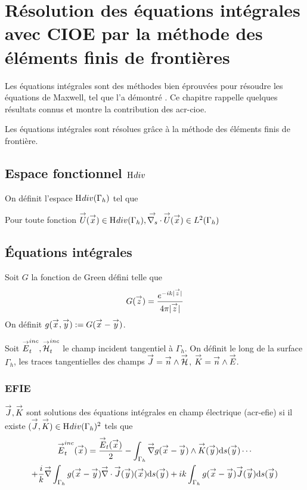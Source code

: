 \section{Résolution des équations intégrales avec CIOE par la méthode des éléments finis de frontières}

  Les équations intégrales sont des méthodes bien éprouvées pour résoudre les équations de Maxwell, tel que l'a démontré \cite{nedelec_acoustic_2001}. Ce chapitre rappelle quelques résultats connus et montre la contribution des \gls{acr-cioe}.

  Les équations intégrales sont résolues grâce à la méthode des éléments finis de frontière.

  \subsection[Espace fonctionnel Hdiv]{Espace fonctionnel \(\mathrm{H}_\mathrm{{}}{div}\)}
    On définit l'espace \(\mathrm{H}_\mathrm{{}}{div}(\Gamma_h)\) tel que
    \begin{defn}
      Pour toute fonction \({\overset{\rightarrow}{U}}({\overset{\rightarrow}{x}}) \in \mathrm{H}_\mathrm{{}}{div}(\Gamma_h), {\overset{\rightarrow}{\nabla_s}} \cdot{\overset{\rightarrow}{U}}({\overset{\rightarrow}{x}}) \in L^2(\Gamma_h)\)
    \end{defn}

  \subsection{Équations intégrales}

      Soit \(G\) la fonction de Green défini telle que
      \begin{equation}
        G({\overset{\rightarrow}{z}}) = \dfrac{e^{-ik|{\overset{\rightarrow}{z}}|}}{4\pi|{\overset{\rightarrow}{z}}|}
      \end{equation}
      On définit \(g({\overset{\rightarrow}{x}},{\overset{\rightarrow}{y}}) := G({\overset{\rightarrow}{x}} - {\overset{\rightarrow}{y}})\).

      Soit \({\overset{\rightarrow}{E}}^{inc}_t,{\overset{\rightarrow}{\mathcal{H}}}^{inc}_t\) le champ incident tangentiel à \(\Gamma_h\). On définit le long de la surface \(\Gamma_h\), les traces tangentielles des champs \({\overset{\rightarrow}{J}} = {\overset{\rightarrow}{n}} \wedge {\overset{\rightarrow}{\mathcal{H}}}\), \({\overset{\rightarrow}{K}} = {\overset{\rightarrow}{n}} \wedge {\overset{\rightarrow}{E}}\).

      \subsubsection{EFIE}

        \begin{defn}
          \({\overset{\rightarrow}{J}},{\overset{\rightarrow}{K}}\) sont solutions des équations intégrales en champ électrique (\gls{acr-efie}) si il existe \(({\overset{\rightarrow}{J}},{\overset{\rightarrow}{K}}) \in \mathrm{H}_\mathrm{{}}{div}(\Gamma_h)^2\) tels que
          \begin{multline}
            \label{eq:form_int:EFIE}
            \vE^{inc}_t(\vx) =
              \frac{\vE_t(\vx)}{2}
                - \int_{\Gamma_h} \vgrad g(\vx - \vy) \pvect \vK(\vy) \dd{s}(\vy) \cdots \\
              + \frac{i}{k}\vgrad \int_{\Gamma_h}  g(\vx - \vy)\vdiv\vJ(\vy)(\vx) \dd{s}(\vy)
                +  ik\int_{\Gamma_h} g(\vx - \vy)\vJ(\vy) \dd{s}(\vy)
          \end{multline}
        \end{defn}

